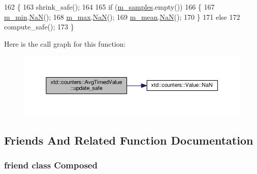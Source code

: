 \begin{DoxyCode}
162 \{
163   shrink\_safe();
164 
165   \textcolor{keywordflow}{if} (\hyperlink{classxtd_1_1counters_1_1AvgTimedValue_af33c7f1f69e37ef49e4195de8f4ac6e2}{m\_samples}.empty())
166   \{
167     \hyperlink{classxtd_1_1counters_1_1AvgTimedValue_aeed066e7062c73d577033308bc0344bf}{m\_min}.\hyperlink{classxtd_1_1counters_1_1Value_ab206db077ef38ac776a7e64774f56f2b}{NaN}();
168     \hyperlink{classxtd_1_1counters_1_1AvgTimedValue_a90ef2640c6d711a3eef2585aaef50afb}{m\_max}.\hyperlink{classxtd_1_1counters_1_1Value_ab206db077ef38ac776a7e64774f56f2b}{NaN}();
169     \hyperlink{classxtd_1_1counters_1_1AvgTimedValue_ab0eb52c60a1fe28c6ea148270ca8cc74}{m\_mean}.\hyperlink{classxtd_1_1counters_1_1Value_ab206db077ef38ac776a7e64774f56f2b}{NaN}();
170   \}
171   \textcolor{keywordflow}{else}
172     compute\_safe();
173 \}
\end{DoxyCode}


Here is the call graph for this function\-:
\nopagebreak
\begin{figure}[H]
\begin{center}
\leavevmode
\includegraphics[width=350pt]{classxtd_1_1counters_1_1AvgTimedValue_a1430fd5ff91e960a251b0656c2b5c0ca_cgraph}
\end{center}
\end{figure}




\subsection{Friends And Related Function Documentation}
\hypertarget{classxtd_1_1counters_1_1AvgTimedValue_a93e934ad70d5b32b14beed5572450abf}{
\subsubsection[{Composed}]{\setlength{\rightskip}{0pt plus 5cm}friend class {\bf Composed}\hspace{0.3cm}{\ttfamily [friend]}}}\label{classxtd_1_1counters_1_1AvgTimedValue_a93e934ad70d5b32b14beed5572450abf}


